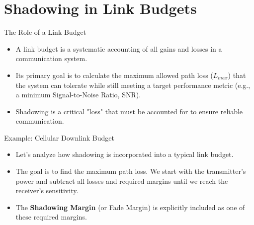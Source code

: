 \documentclass{beamer}
\begin{document}
	\section{Shadowing in Link Budgets}
	
	\begin{frame}{The Role of a Link Budget}
		\begin{itemize}
			\item A link budget is a systematic accounting of all gains and losses in a communication system.
			\item Its primary goal is to calculate the maximum allowed path loss ($L_{max}$) that the system can tolerate while still meeting a target performance metric (e.g., a minimum Signal-to-Noise Ratio, SNR).
			\item Shadowing is a critical "loss" that must be accounted for to ensure reliable communication.
		\end{itemize}
	\end{frame}
	
	\begin{frame}{Example: Cellular Downlink Budget}
		\begin{itemize}
			\item Let's analyze how shadowing is incorporated into a typical link budget.
			\item The goal is to find the maximum path loss. We start with the transmitter's power and subtract all losses and required margins until we reach the receiver's sensitivity.
			\item The \textbf{Shadowing Margin} (or Fade Margin) is explicitly included as one of these required margins.
		\end{itemize}
	\end{frame}
	
\end{document}
